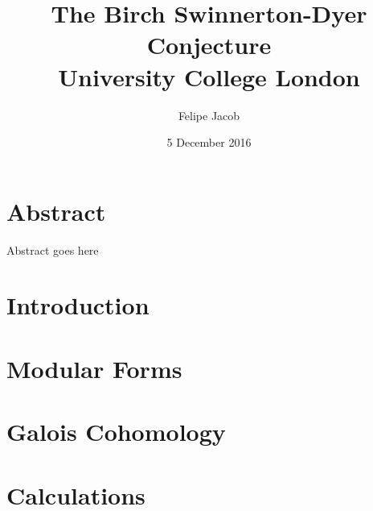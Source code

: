 \documentclass[12pt]{report}
\begin{document}
\title{
  {The Birch Swinnerton-Dyer Conjecture}\\
  {\large University College London}\\
}
\author{Felipe Jacob}
\date{5 December 2016}


\chapter*{Abstract}
Abstract goes here

\tableofcontents

\chapter{Introduction}
 

\chapter{Modular Forms}


\chapter{Galois Cohomology}


\chapter{Calculations}

\end{document}
